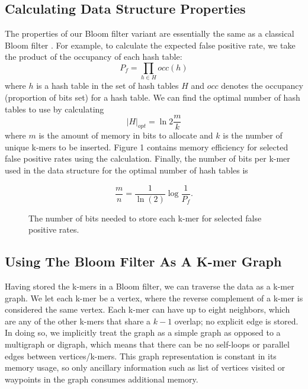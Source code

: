 \documentclass[12pt]{article} \usepackage{simplemargins}
\begin{document}
\subsection{Calculating Data Structure Properties}
The properties of our Bloom filter variant are essentially the
same as a classical Bloom filter \cite{bloomsurvey}.
For example, to calculate the expected false positive 
rate, we
take the product of the occupancy of each hash table:
\begin{displaymath}
P_f = \prod_{h \in H} occ(h)
\end{displaymath}
where $h$ is a hash table in the set of hash tables $H$ and $occ$ denotes
the occupancy (proportion of bits set) for a hash table.
We can find the optimal number of hash tables
to use by calculating
\begin{displaymath}
\vert H \vert_{opt} = \ln 2 \frac{m}{k}
\end{displaymath}
where $m$ is the amount of memory in bits to allocate and $k$
is the number of unique k-mers to be inserted. Figure 1 
contains memory efficiency for selected false positive rates 
using the calculation. Finally,
the number of bits per
k-mer used in the data structure for the optimal number of hash 
tables is

\begin{displaymath}
\frac{m}{n} = \frac{1}{\ln(2)} \log{\frac{1}{P_f}}.
\end{displaymath}

\begin{figure}
\caption{The number of bits needed to store each k-mer for selected
false positive rates.}
\end{figure}

\subsection{Using The Bloom Filter As A K-mer Graph}
Having stored the k-mers in a Bloom filter, we can traverse
the data as a k-mer graph. We let each k-mer be a vertex, where
the reverse complement of a k-mer is considered the same
vertex. Each k-mer can
have up to eight neighbors, which are any of the other k-mers that
 share a $k-1$
overlap; no explicit edge is stored. In doing so, we implicitly 
treat the graph as a simple graph as opposed to a multigraph or 
digraph, which means that there can be no self-loops or parallel 
edges between vertices/k-mers. This graph representation is constant 
in its memory usage, so only ancillary information such as list 
of vertices visited or waypoints in the graph consumes additional 
memory.
\end{document}
